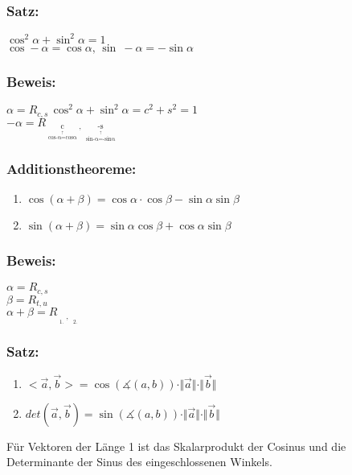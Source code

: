  \subsubsection{Satz:}
 $\cos^{2}\alpha + \sin^{2}\alpha =1$\\
 $\cos -\alpha=\cos\alpha, \, \sin\ -\alpha=-\sin\alpha$
%
 \subsubsection{Beweis:}
 $\alpha = R_{c,s} \, \cos^{2}\alpha+\sin^{2}\alpha= c^{2}+s^{2}=1$\\
 $-\alpha=R_{\mathop{c}\limits_{\mathop{\cos-\alpha = \cos \alpha}\limits^{\uparrow}}, \, \mathop{-s}\limits_{\mathop{\sin-\alpha = -\sin\alpha}\limits^{\uparrow}}}$\\
 \subsubsection{Additionstheoreme:}
 \begin{enumerate}
 	\item $\cos(\alpha+\beta) = \cos\alpha\cdot\cos\beta-\sin\alpha\sin\beta$
 	\item $\sin(\alpha+\beta)=\sin\alpha\cos\beta+\cos\alpha\sin\beta$
\end{enumerate}
%
%
%
\subsubsection{Beweis:}
$\alpha=R_{c,s}$\\
$\beta=R_{t,u}$\\
$\alpha+\beta=R_{\mathop{\underbrace{ct-su}}\limits_{1.},\, \mathop{\underbrace{cu+st}}\limits_{2.}}$
%
%
%
\subsubsection{Satz:}
\begin{enumerate}
	\item $ <\vec{a},\vec{b}>=\cos(\measuredangle(a,b))\cdot\Vert\vec{a}\Vert
	\cdot\Vert\vec{b}\Vert$
	\item $det(\vec{a},\vec{b})=\sin(\measuredangle(a,b))\cdot\Vert\vec{a}\Vert
	\cdot \Vert\vec{b}\Vert$
\end{enumerate}
Für Vektoren der Länge 1 ist das Skalarprodukt der Cosinus und die Determinante der Sinus des eingeschlossenen Winkels. 
%
%
%

